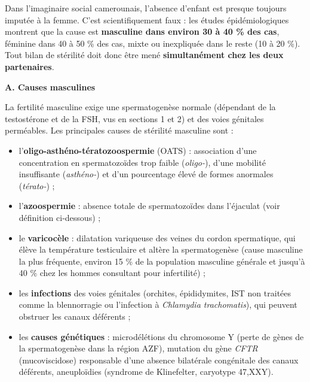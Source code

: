 \documentclass[11pt]{article}
\newcommand{\cle}[1]{{\popxbold\color{popdark}#1}}
\newcounter{popsec}
\newcounter{popsub}
\newcommand{\courssub}[1]{%
  \stepcounter{popsub}%
  \par\vspace{9pt}\noindent{\popxbold\fontsize{11.5}{13}\selectfont\color{popink}{\color{poporange}\thepopsec.\thepopsub}\hspace{6pt}#1}\par\nopagebreak\vspace{4pt}
}
\begin{document}
\begin{attention}
Dans l'imaginaire social camerounais, l'absence d'enfant est presque toujours imputée à la femme. C'est scientifiquement faux : les études épidémiologiques montrent que la cause est \textbf{masculine dans environ 30 à 40 \% des cas}, féminine dans 40 à 50 \% des cas, mixte ou inexpliquée dans le reste (10 à 20 \%). Tout bilan de stérilité doit donc être mené \textbf{simultanément chez les deux partenaires}.
\end{attention}

\courssub{Causes de la stérilité}

\textbf{A. Causes masculines}\par

La fertilité masculine exige une spermatogenèse normale (dépendant de la testostérone et de la FSH, vus en sections 1 et 2) et des voies génitales perméables. Les principales causes de stérilité masculine sont :

\begin{itemize}
\item l'\textbf{oligo-asthéno-tératozoospermie} (\cle{OATS}) : association d'une concentration en spermatozoïdes trop faible (\emph{oligo-}), d'une mobilité insuffisante (\emph{asthéno-}) et d'un pourcentage élevé de formes anormales (\emph{térato-}) ;
\item l'\textbf{azoospermie} : absence totale de spermatozoïdes dans l'éjaculat (voir définition ci-dessous) ;
\item le \textbf{varicocèle} : dilatation variqueuse des veines du cordon spermatique, qui élève la température testiculaire et altère la spermatogenèse (cause masculine la plus fréquente, environ 15 \% de la population masculine générale et jusqu'à 40 \% chez les hommes consultant pour infertilité) ;
\item les \textbf{infections} des voies génitales (orchites, épididymites, IST non traitées comme la blennorragie ou l'infection à \emph{Chlamydia trachomatis}), qui peuvent obstruer les canaux déférents ;
\item les \textbf{causes génétiques} : microdélétions du chromosome Y (perte de gènes de la spermatogenèse dans la région AZF), mutation du gène \emph{CFTR} (mucoviscidose) responsable d'une absence bilatérale congénitale des canaux déférents, aneuploïdies (syndrome de Klinefelter, caryotype 47,XXY).
\end{itemize}
\end{document}
